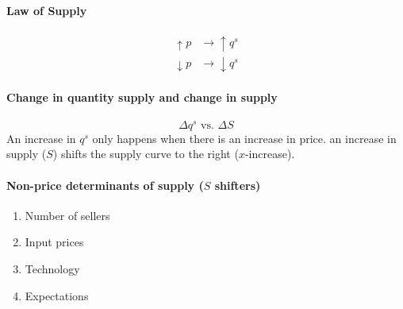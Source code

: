 \documentclass{article}
\begin{document}
\begin{spacing}{1.2}
    \newpage
    \paragraph{Law of Supply}
    \begin{align*}
        \uparrow p &\longrightarrow \uparrow q^s \\
        \downarrow p &\longrightarrow \downarrow q^s
    \end{align*}
\paragraph{Change in quantity supply and change in supply}
    \[\Delta q^s \text{    vs.    } \Delta S\]
    An increase in \(q^s\) only happens when there is an increase in price.
    an increase in supply (\(S\)) shifts the supply curve to the right (\(x\)-increase).

\paragraph{Non-price determinants of supply (\(S\) shifters)}
    
    \begin{enumerate}
        \item Number of sellers
        \item Input prices
        \item Technology
        \item Expectations
    \end{enumerate}

\end{spacing}
\end{document}
